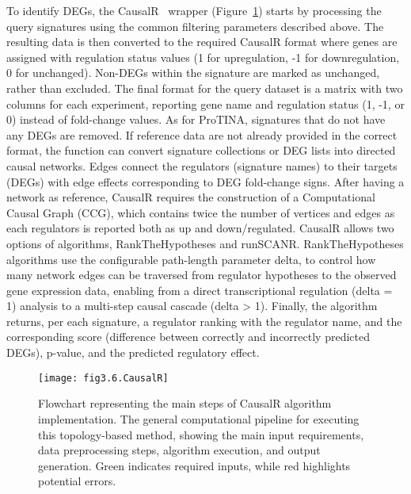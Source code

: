 To identify DEGs, the CausalR~\cite{RN32} wrapper (Figure~\ref{fig:fig3.6.CausalR}) starts by processing the query signatures using the common filtering parameters described above. The resulting data is then converted to the required CausalR format where genes are assigned with regulation status values (1 for upregulation, -1 for downregulation, 0 for unchanged). Non-DEGs within the signature are marked as unchanged, rather than excluded. The final format for the query dataset is a matrix with two columns for each experiment, reporting gene name and regulation status (1, -1, or 0) instead of fold-change values. As for ProTINA, signatures that do not have any DEGs are removed. If reference data are not already provided in the correct format, the function can convert signature collections or DEG lists into directed causal networks. Edges connect the regulators (signature names) to their targets (DEGs) with edge effects corresponding to DEG fold-change signs. 
After having a network as reference, CausalR requires the construction of a Computational Causal Graph (CCG), which contains twice the number of vertices and edges as each regulators is reported both as up and down/regulated. CausalR allows two options of algorithms, RankTheHypotheses and runSCANR. RankTheHypotheses algorithms use the configurable path-length parameter delta, to control how many network edges can be traversed from regulator hypotheses to the observed gene expression data, enabling from a direct transcriptional regulation (delta = 1) analysis to a multi-step causal cascade (delta > 1). Finally, the algorithm returns, per each signature, a regulator ranking with the regulator name, and the corresponding score (difference between correctly and incorrectly predicted DEGs), p-value, and the predicted regulatory effect.

\begin{figure}[htbp]
    \centering
    \texttt{[image: fig3.6.CausalR]}
    \caption[Flowchart representing the main steps of CausalR algorithm implementation.]{Flowchart representing the main steps of CausalR algorithm implementation. The general computational pipeline for executing this topology-based method, showing the main input requirements, data preprocessing steps, algorithm execution, and output generation. Green indicates required inputs, while red highlights potential errors.}
    \label{fig:fig3.6.CausalR}
\end{figure}


